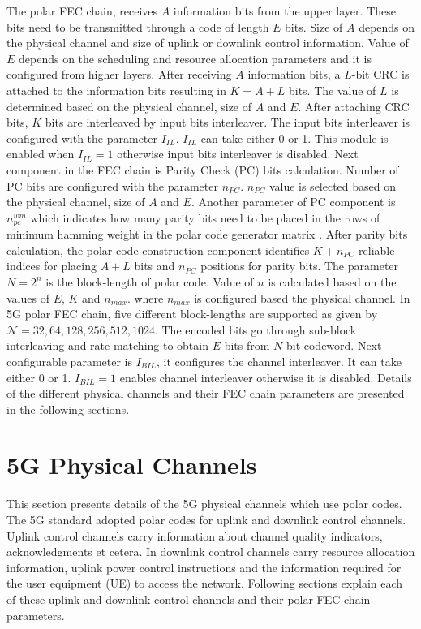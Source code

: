 The polar FEC chain, receives $A$ information bits from the upper layer. These bits need to be transmitted through a code of length $E$ bits. Size of $A$ depends on the physical channel and size of uplink or downlink control information. Value of $ E $ depends on the scheduling and resource allocation parameters and it is configured from higher layers. After receiving $A$ information bits, a $L$-bit CRC is attached to the information bits resulting in $K = A + L$ bits. The  value of $L$ is determined based on the physical channel, size of $A$ and $E$. After attaching CRC bits, $K$ bits are interleaved by input bits interleaver. The input bits interleaver is configured with the parameter $I_{IL}$. $I_{IL}$ can take either 0 or 1. This module is enabled when $I_{IL} = 1$ otherwise input bits interleaver is disabled. Next component in the FEC chain is Parity Check (PC) bits calculation. Number of PC bits are configured with the parameter $n_{PC}$. $n_{PC}$ value is selected based on the physical channel, size of $A$ and $E$. Another parameter of PC component is $n_{pc}^{wm}$ which indicates how many parity bits need to be placed in the rows of minimum hamming weight in the polar code generator matrix \cite{3gpp.38.212}. After parity bits calculation, the polar code construction component identifies  $K + n_{PC}$ reliable indices for placing $A+L$ bits and $n_{PC}$ positions for parity bits. The parameter $N = 2^n$ is the block-length of polar code. Value of $n$ is calculated based on the values of $E$, $K$ and $n_{max}$. where $n_{max}$ is configured based the physical channel. In 5G polar FEC chain, five different block-lengths are supported as given by $\mathcal{N} = {32,64,128,256,512,1024}$. The encoded bits go through sub-block interleaving and rate matching to obtain $E$ bits from $N$ bit codeword. Next configurable parameter is $I_{BIL}$, it configures the channel interleaver. It can take either 0 or 1. $I_{BIL} = 1$ enables channel interleaver otherwise it is disabled. Details of the different physical channels and their FEC chain parameters are presented in the following sections.

\section{5G Physical Channels}
This section presents details of the 5G physical channels which use polar codes. The 5G standard adopted polar codes for uplink and downlink control channels. Uplink control channels carry information about channel quality indicators, acknowledgments et cetera. In downlink control channels carry resource allocation information, uplink power control instructions and the information required for the user equipment (UE) to access the network. Following sections explain each of these uplink and downlink control channels and their polar FEC chain parameters.

